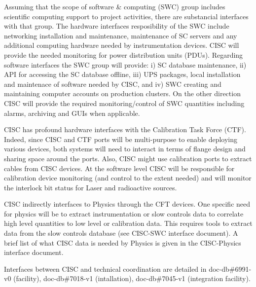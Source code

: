 Assuming that the scope of software \& computing (SWC) group includes scientific computing support to project activities, there are substancial interfaces with that group. 
The hardware interfaces resposibility of the SWC include networking installation and maintenance,
maintenance of SC servers and any additional computing hardware needed by instrumentation devices.
CISC will provide the needed monitoring for power distribution units (PDUs). Regarding software interfaces the SWC group will provide:
i) SC database maintenance, ii) API for accessing the SC database offline,
iii) UPS packages, local installation and maintenace of software needed by CISC, and iv) SWC creating and maintaining computer accounts on production clusters. 
On the other direction CISC will provide the required monitoring/control of SWC quantities including alarms, archiving and GUIs when applicable. 


CISC has profound hardware interfaces with the Calibration Task Force (CTF). Indeed, since CISC and CTF ports will be multi-purpose to enable deploying various devices,
both systems will need to interact in terms of flange design and sharing space around the ports. Also, CISC might use calibration ports to extract cables from CISC devices. 
At the software level CISC will be responsible for calibration device monitoring (and control to the extent needed) and will 
monitor the interlock bit status for Laser and radioactive sources. 

CISC indirectly interfaces to Physics through the CFT devices. One specific need for physics will be to extract
instrumentation or slow controls data to correlate high level quantities to low level or calibration data.
This requires tools to extract data from the slow controls database (see CISC-SWC interface document).
A brief list of what CISC data is needed by Physics is given in the CISC-Physics interface document. 

Interfaces between CISC and technical coordination are detailed in doc-db\#6991-v0 (facility), doc-db\#7018-v1 (intallation), doc-db\#7045-v1 (integration facility). 




